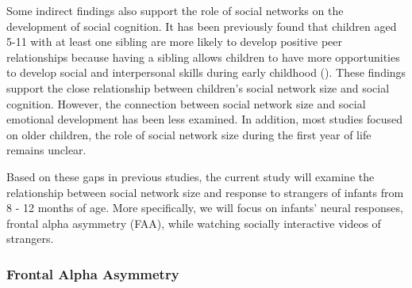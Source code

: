 \documentclass[
  man,
  floatsintext,
  longtable,
  nolmodern,
  notxfonts,
  notimes,
  colorlinks=true,linkcolor=blue,citecolor=blue,urlcolor=blue]{apa7}
\begin{document}
Some indirect findings also support the role of social networks on the
development of social cognition. It has been previously found that
children aged 5-11 with at least one sibling are more likely to develop
positive peer relationships because having a sibling allows children to
have more opportunities to develop social and interpersonal skills
during early childhood
().
These findings support the close relationship between children's social
network size and social cognition. However, the connection between
social network size and social emotional development has been less
examined. In addition, most studies focused on older children, the role
of social network size during the first year of life remains unclear.

Based on these gaps in previous studies, the current study will examine
the relationship between social network size and response to strangers
of infants from 8 - 12 months of age. More specifically, we will focus
on infants' neural responses, frontal alpha asymmetry (FAA), while
watching socially interactive videos of strangers.

\subsubsection{Frontal Alpha Asymmetry}\label{frontal-alpha-asymmetry}
\end{document}
